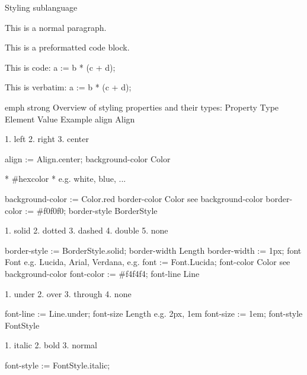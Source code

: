 Styling sublanguage

This is a normal paragraph.

This is a preformatted
code block.

This is code: a := b * (c + d);

    This is verbatim: a := b * (c + d);

emph strong
Overview of styling properties and their types:
Property 	Type 	Element 	Value 	Example
align 	Align 		

   1. left
   2. right
   3. center

	align := Align.center;
background-color 	Color 		

    * #hexcolor
    * e.g. white, blue, ...

	background-color := Color.red
border-color 	Color 		see background-color 	border-color := #f0f0f0;
border-style 	BorderStyle 		

   1. solid
   2. dotted
   3. dashed
   4. double
   5. none

	border-style := BorderStyle.solid;
border-width 	Length 			border-width := 1px;
font 	Font 		e.g. Lucida, Arial, Verdana, e.g. 	font := Font.Lucida;
font-color 	Color 		see background-color 	font-color := #f4f4f4;
font-line 	Line 		

   1. under
   2. over
   3. through
   4. none

	font-line := Line.under;
font-size 	Length 		e.g. 2px, 1em 	font-size := 1em;
font-style 	FontStyle 		

   1. italic
   2. bold
   3. normal

	font-style := FontStyle.italic;
